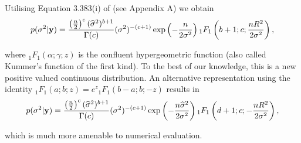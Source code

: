 \documentclass{article}[12pt]
\newcommand{\joc}[1]{{\color{red}#1}}
\begin{document}
%
%

\noindent 
Utilising Equation 3.383(i) of \cite{Gradshteyn2007} (see Appendix A) we obtain  
$$
\displaystyle p(\sigma^2|{\bf y}) 
\displaystyle = 
\frac{\left(\tfrac{n}{2}\right)^c (\widehat{\sigma}^2)^{b+1}}{\Gamma(c)} (\sigma^2)^{-(c+1)} \exp\left(  - \frac{n}{2\sigma^2} \right)
{}_1 F_1\left(b + 1; c; \frac{nR^2}{2\sigma^2} \right),
$$

\noindent where 
${}_1 F_1(\alpha;\gamma;z)$ 
is the confluent hypergeometric function (also called
Kummer's function of the first kind).
To the best of our knowledge, this is a new positive valued continuous distribution.
An alternative representation using the identity ${}_1F_1(a;b;z) = e^z {}_1F_1(b-a;b;-z)$ results in
$$
\displaystyle p(\sigma^2|{\bf y}) 
\displaystyle = 
\frac{\left(\tfrac{n}{2}\right)^c (\widehat{\sigma}^2)^{b+1}}{\Gamma(c)} (\sigma^2)^{-(c+1)} \exp\left(  - \frac{n \widehat{\sigma}^2}{2\sigma^2} \right)
{}_1 F_1\left( d + 1; c; -\frac{nR^2}{2\sigma^2} \right),
$$

\noindent which is much more amenable to numerical evaluation. 
 
\end{document}
